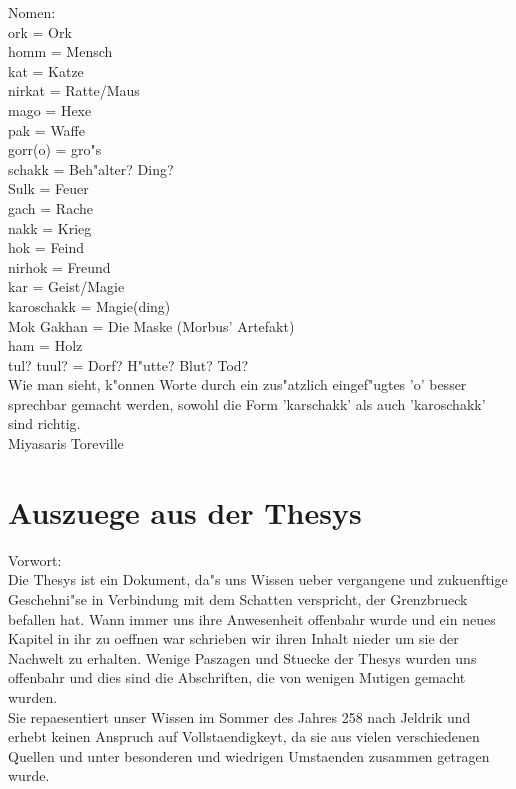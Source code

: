 \documentclass[a5paper,8pt]{book}
\begin{document}
Nomen: \\
ork = Ork\\ 
homm = Mensch\\
kat = Katze \\
nirkat = Ratte/Maus  \\
mago = Hexe \\
pak = Waffe\\
gorr(o) = gro"s \\
schakk = Beh"alter? Ding?\\
Sulk = Feuer \\
gach = Rache \\
nakk = Krieg \\
hok = Feind  \\
nirhok = Freund\\
kar = Geist/Magie\\ 
karoschakk = Magie(ding)\\
Mok Gakhan = Die Maske (Morbus' Artefakt)\\
ham = Holz \\
tul? tuul? = Dorf? H"utte? Blut? Tod? \\

Wie man sieht, k"onnen Worte durch ein zus"atzlich eingef"ugtes 'o' besser sprechbar gemacht werden, sowohl die Form 'karschakk' als auch 'karoschakk' sind richtig. \\
Miyasaris Toreville
\newpage

\section{ Auszuege aus der Thesys}

Vorwort:\\
Die Thesys ist ein Dokument, da"s uns Wissen ueber vergangene und zukuenftige Geschehni"se in Verbindung mit dem Schatten verspricht, der Grenzbrueck befallen hat. 
Wann immer uns ihre Anwesenheit offenbahr wurde und ein neues Kapitel in ihr zu oeffnen war schrieben wir ihren Inhalt nieder um sie der Nachwelt zu erhalten. 
Wenige Paszagen und Stuecke der Thesys wurden uns offenbahr und dies sind die Abschriften, die von wenigen Mutigen gemacht wurden.\\
Sie repaesentiert unser Wissen im Sommer des Jahres 258 nach Jeldrik und erhebt keinen Anspruch auf Vollstaendigkeyt, da sie aus vielen verschiedenen Quellen 
und unter besonderen und wiedrigen Umstaenden zusammen getragen wurde.
\newpage
\end{document}
